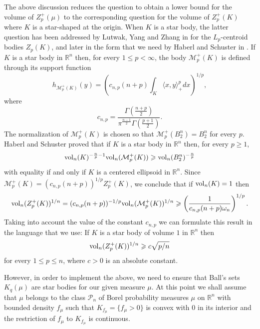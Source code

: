 \documentclass[11pt,leqno]{article}
\theoremstyle{definition}
\theoremstyle{remark}
\numberwithin{equation}{section}
\newcommand{\vol}{{\rm vol}}
\newcommand{\ls}{\leqslant}
\newcommand{\gr}{\geqslant}
\newcommand{\1}{\textbf{1}}
\begin{document}
The above discussion reduces the question to obtain a lower bound for the
volume of $Z_p^+(\mu)$ to the corresponding question for the volume of $Z_p^+(K)$
where $K$ is a star-shaped at the origin. When $K$ is a star body, the latter
question has been addressed by Lutwak, Yang and Zhang
in \cite{Lutwak-Yang-Zhang-2000} for the $L_p$-centroid bodies $Z_p(K)$, and later in
the form that we need by Haberl and Schuster in \cite{Haberl-Schuster-2009}. If $K$ is
a star body in ${\mathbb R}^n$
then, for every $1\ls p<\infty $, the body $\mathcal{M}_p^+(K)$ is defined
through its support function
\begin{equation*}h_{\mathcal{M}_p^+(K)}(y)=\left (c_{n,p}(n+p)\int_K\langle x,y\rangle_+^p
dx\right )^{1/p},\end{equation*} where
\begin{equation*}c_{n,p}=\frac{\Gamma\left(\frac{n+p}{2}\right)}{\pi^{\frac{n-1}{2}}\Gamma\left(\frac{p+1}{2}\right)}.\end{equation*}
The normalization of $\mathcal{M}_p^+(K)$ is chosen so that
$\mathcal{M}_p^+(B_2^n)=B_2^n$ for every $p$. Haberl and Schuster \cite[Theorem~6.4]{Haberl-Schuster-2009}
proved that if $K$ is a star body in ${\mathbb R}^n$ then, for every $p\gr 1$,
\begin{equation*}\vol_n(K)^{-\frac{n}{p}-1}\vol_n(\mathcal{M}_p^+(K))\gr \vol_n(B_2^n)^{-\frac{n}{p}}\end{equation*}
with equality if and only if $K$ is a centered ellipsoid in $\mathbb{R}^n$.
Since $\mathcal{M}_p^+(K)=(c_{n,p}(n+p))^{1/p}Z_p^+(K)$, we conclude that if $\vol_n(K)=1$
then
$$\vol_n(Z_p^+(K))^{1/n}=(c_{n,p}(n+p))^{-1/p}\vol_n(\mathcal{M}_p^+(K))^{1/n}\gr \left(\frac{1}{c_{n,p}(n+p)\omega_n}\right)^{1/p}.$$
Taking into account the value of the constant $c_{n,p}$ we can formulate
this result in the language that we use: If $K$ is a star body of volume $1$ in $\mathbb{R}^n$
then
\begin{equation}\label{eq:Zp-star}\vol_n(Z_p^+(K))^{1/n}\gr c\sqrt{p/n}\end{equation}
for every $1\ls p\ls n$, where $c>0$ is an absolute constant.

However, in order to implement the above, we need to ensure that Ball's sets $K_q(\mu)$ are star bodies
for our given measure $\mu$. At this point we shall assume that $\mu$ belongs to the class $\mathcal{P}_n$
of Borel probability measures $\mu$ on $\mathbb{R}^n $ with bounded density $f_\mu$ such that
$K_{f_\mu}=\{f_\mu>0\}$ is convex  with $0$ in its interior and the restriction of $f_\mu$ to $K_{f_\mu}$ is continuous.
\end{document}
